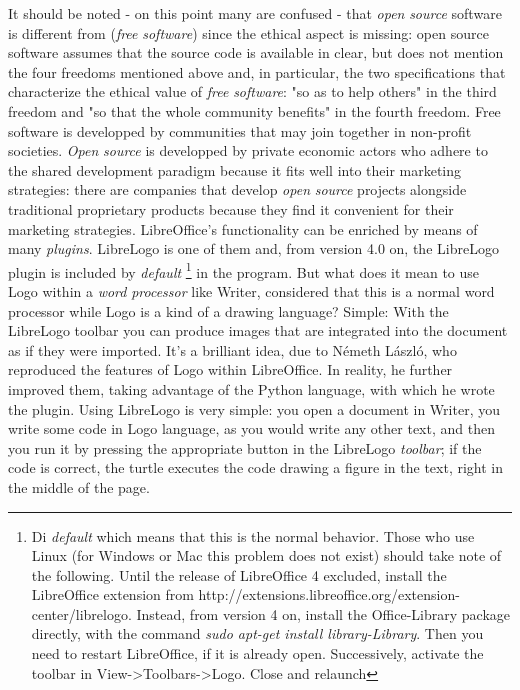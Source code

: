 It should be noted - on this point many are confused - that \textit{open} \textit{source} software is different from (\textit{free} \textit{software}) since the ethical aspect is missing: open source software assumes that the source code is available in clear, but does not mention the four freedoms mentioned above and, in particular, the two specifications that characterize the ethical value of \textit{free} \textit{software}: "so as to help others" in the third freedom and "so that the whole community benefits" in the fourth freedom. Free software is developped by communities that may join together in non-profit societies. \textit{Open} \textit{source} is developped by private economic actors who adhere to the shared development paradigm because it fits well into their marketing strategies: there are companies that develop \textit{open} \textit{source} projects alongside traditional proprietary products because they find it convenient for their marketing strategies. LibreOffice's functionality can be enriched by means of many \textit{plugins}. LibreLogo is one of them and, from version 4.0 on, the LibreLogo plugin is included by \textit{default} \footnote{Di \textit{default} which means that this is the normal behavior. Those who use Linux (for Windows or Mac this problem does not exist) should take note of the following. Until the release of LibreOffice 4 excluded, install the LibreOffice extension from http://extensions.libreoffice.org/extension-center/librelogo. Instead, from version 4 on, install the Office-Library package directly, with the command \textit{sudo apt-get install library-Library}. Then you need to restart LibreOffice, if it is already open. Successively, activate the toolbar in View->Toolbars->Logo. Close and relaunch} in the program. But what does it mean to use Logo within a \textit{word} \textit{processor} like Writer, considered that this is a normal word processor while Logo is a kind of a drawing language? Simple: With the LibreLogo toolbar you can produce images that are integrated into the document as if they were imported. It's a brilliant idea, due to Németh László, who reproduced the features of Logo within LibreOffice. In reality, he further improved them, taking advantage of the Python language, with which he wrote the plugin. Using LibreLogo is very simple: you open a document in Writer, you write some code in Logo language, as you would write any other text, and then you run it by pressing the appropriate button in the LibreLogo \textit{toolbar}; if the code is correct, the turtle executes the code drawing a figure in the text, right in the middle of the page.

